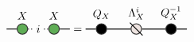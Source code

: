 
\renewcommand{\graphTensorSpacing}{1.1}
\renewcommand{\graphTensorTwoStart}{2.25*\graphTensorSpacing}
\[
\begin{tikzpicture}[baseline=-0.65ex]
	\node[circle,draw=black!80,thick,fill=myGreen,label=above:$X$] (X) at (0,0) {};
	\node (i) at (\graphLineSpacing,0) {$i$};
	\node[circle,draw=black!80,thick,fill=myGreen,label=above:$X$] (X1) at (2*\graphLineSpacing,0) {};

	\draw[thick, draw=black] (-\graphLineSpacing,0) -- (X) {};
	\draw[thick, dotted] (X) -- (i) -- (X1) {};
	\draw[thick, draw=black]  (X1) -- (3*\graphLineSpacing,0){};
\end{tikzpicture}
=
\begin{tikzpicture}[baseline=-0.65ex]
	\node[circle,draw=black!80,thick,fill=black,label=above:$Q_X$] (Q) at (0,0) {};
	
	\node[circle,draw=black!80,thick,fill=myGrey,label=above:$\Lambda_X^i$] (LAMBDA) at (\graphTensorSpacing,0) {};
	\draw[thick] (\graphTensorSpacing - 0.2,0 + 0.2) -- (\graphTensorSpacing + 0.2,0 - 0.2) {};

	\node[circle,draw=black!80,thick,fill=black,label=above:$Q_X^{-1}$] (Q1) at (2*\graphTensorSpacing,0) {};

	\draw[thick, draw=black] (-\graphLineSpacing,0) -- (Q) -- (LAMBDA) -- (Q1) -- (2*\graphTensorSpacing + \graphLineSpacing,0) {};

\end{tikzpicture}
\]